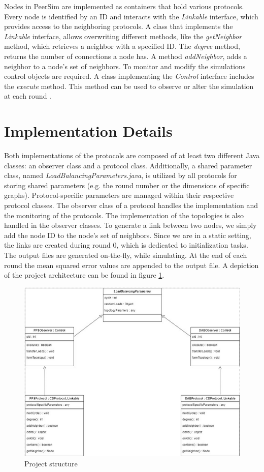 Nodes in PeerSim are implemented as containers that hold various protocols. Every node is identified by an ID and interacts with the \textit{Linkable} interface, which provides 
access to the neighboring protocols. A class that implements the \textit{Linkable} interface, allows overwriting different methods, like the \textit{getNeighbor} method, which retrieves a neighbor with a specified ID. The \textit{degree} method, returns the number of connections a node has. A method \textit{addNeighbor}, adds a neighbor to a node's set of neighbors. To monitor and modify the simulations control objects are required. A class implementing the \textit{Control} interface includes the \textit{execute} method. This method can be used to observe or alter the simulation at each round \cite{peersimdocs}.

\section{Implementation Details}
Both implementations of the protocols are composed of at least two different Java classes: an observer class and a protocol class. Additionally, a shared parameter class, named \textit{LoadBalancingParameters.java}, is utilized by all protocols for storing shared parameters (e.g. the round number or the dimensions of specific graphs). Protocol-specific parameters are managed within their respective protocol classes. The observer class of a protocol handles the implementation and the monitoring of the protocols. The implementation of the topologies is also handled in the observer classes. To generate a link between two nodes, we simply add the node ID to the node's set of neighbors. Since we are in a static setting, the links are created during round 0, which is dedicated to initialization tasks. The output files are generated on-the-fly, while simulating. At the end of each round the mean squared error values are appended to the output file. A depiction of the project architecture can be found in figure \ref{fig:uml}.

\begin{figure}[H]
    \centering
    \includegraphics[scale=0.7]{figures/uml/projectArchUml.png}
    \caption{Project structure}
    \label{fig:uml}
\end{figure}
